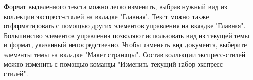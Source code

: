 \documentclass{article}
\begin{document}
Формат выделенного текста можно легко изменить, выбрав нужный вид из коллекции экспресс-стилей на вкладке "Главная". Текст можно также отформатировать с помощью других элементов управления на вкладке "Главная". Большинство элементов управления позволяют использовать вид из текущей темы и формат, указанный непосредственно. Чтобы изменить вид документа, выберите элементы темы на вкладке "Макет страницы". Состав коллекции экспресс-стилей можно изменить с помощью команды "Изменить текущий набор экспресс-стилей".
\end{document}
